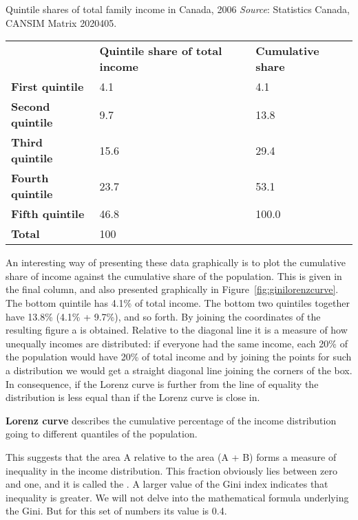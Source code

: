 \begin{Table}{25em}{Quintile shares of total family income in Canada, 2006 \label{table:quintileincome}}{\centering \textit{Source}: Statistics Canada, CANSIM Matrix 2020405.}
\begin{tabu} to \linewidth {|X[1,c]X[1,c]X[1,c]|} \hline 
{}	& \textbf{Quintile share of total income} & \textbf{Cumulative share} \\[0.25em]
						\textbf{First quintile}  & 4.1 & 4.1 \\
	\textbf{Second quintile} & 9.7 & 13.8 \\
						\textbf{Third quintile} & 15.6 & 29.4 \\
	\textbf{Fourth quintile} & 23.7 & 53.1 \\ 
						\textbf{Fifth quintile} & 46.8 & 100.0 \\
	\textbf{Total} & 100 &  \\ \hline 
\end{tabu}
\end{Table}

An interesting way of presenting these data graphically is to plot the cumulative share of income against the cumulative share of the population. This is given in the final column, and also presented graphically in Figure~\ref{fig:ginilorenzcurve}. The bottom quintile has 4.1\% of total income. The bottom two quintiles together have 13.8\% (4.1\% + 9.7\%), and so forth. By joining the coordinates of the resulting figure a  is obtained. Relative to the diagonal line it is a measure of how unequally incomes are distributed: if everyone had the same income, each 20\% of the population would have 20\% of total income and by joining the points for such a distribution we would get a straight diagonal line joining the corners of the box. In consequence, if the Lorenz curve is further from the line of equality the distribution is less equal than if the Lorenz curve is close in.



\begin{DefBox}
\textbf{Lorenz curve} describes the cumulative percentage of the income distribution going to different quantiles of the population.
\end{DefBox}

This suggests that the area A relative to the area (A + B) forms a measure of inequality in the income distribution. This fraction obviously lies between zero and one, and it is called the . A larger value of the Gini index indicates that inequality is greater. We will not delve into the mathematical formula underlying the Gini. But for this set of numbers its value is 0.4.


